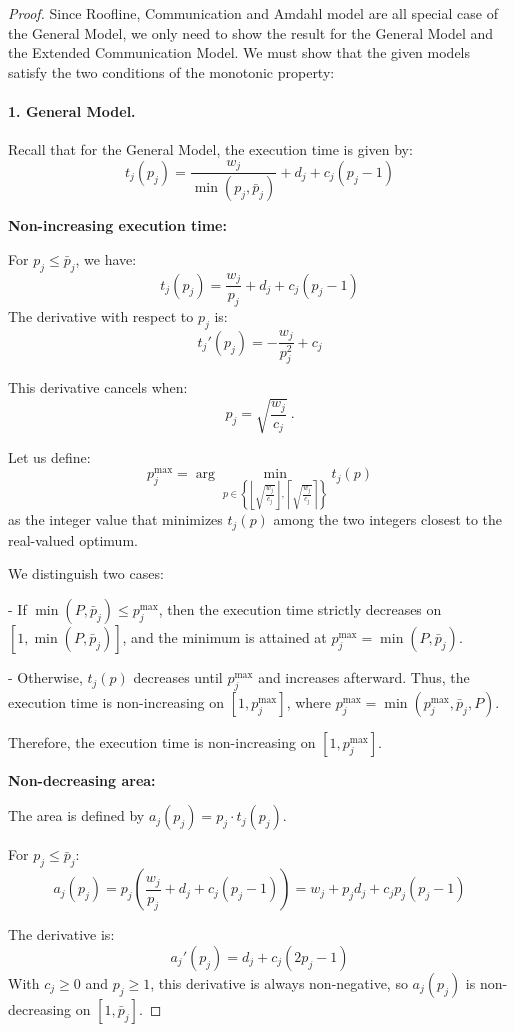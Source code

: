 \documentclass{article}
\begin{document}
\begin{proof}
Since Roofline, Communication and Amdahl model are all special case of the General Model, we only need to show the result for the General Model and the Extended Communication Model.
We must show that the given models satisfy the two conditions of the monotonic property:



\paragraph{1. General Model.}
Recall that for the General Model, the execution time is given by:
\[
t_j(p_j) = \frac{w_j}{\min(p_j, \bar{p}_j)} + d_j + c_j(p_j - 1)
\]

\textbf{Non-increasing execution time:}

For $p_j \leq \bar{p}_j$, we have:
\[
t_j(p_j) = \frac{w_j}{p_j} + d_j + c_j(p_j - 1)
\]
The derivative with respect to $p_j$ is:
\[
t_j'(p_j) = -\frac{w_j}{p_j^2} + c_j
\]

This derivative cancels when:
\[
p_j = \sqrt{\frac{w_j}{c_j}} \ .
\]

Let us define:
\[
p_j^{\max} = \arg\min_{p \in \left\{\left\lfloor \sqrt{\frac{w_j}{c_j}} \right\rfloor, \left\lceil \sqrt{\frac{w_j}{c_j}} \right\rceil\right\}} t_j(p)
\]
as the integer value that minimizes $t_j(p)$ among the two integers closest to the real-valued optimum.

We distinguish two cases:

- If $\min(P, \bar{p}_j) \leq p_j^{\max}$, then the execution time strictly decreases on $[1, \min(P, \bar{p}_j)]$, and the minimum is attained at $p_j^{\max} = \min(P, \bar{p}_j)$.

- Otherwise, $t_j(p)$ decreases until $p_j^{\max}$ and increases afterward. Thus, the execution time is non-increasing on $[1, p_j^{\max}]$, where $p_j^{\max} = \min\left(p_j^{\max}, \bar{p}_j, P\right)$.

Therefore, the execution time is non-increasing on $[1, p_j^{\max}]$.

\textbf{Non-decreasing area:}

The area is defined by $a_j(p_j) = p_j \cdot t_j(p_j)$.

For $p_j \leq \bar{p}_j$:
\[
a_j(p_j) = p_j \left( \frac{w_j}{p_j} + d_j + c_j(p_j - 1) \right) = w_j + p_j d_j + c_j p_j(p_j - 1)
\]

The derivative is:
\[
a_j'(p_j) = d_j + c_j(2p_j - 1)
\]
With $c_j \geq 0$ and $p_j \geq 1$, this derivative is always non-negative, so $a_j(p_j)$ is non-decreasing on $[1, \bar{p}_j]$.


\end{proof}
\end{document}
